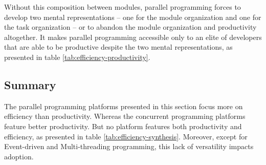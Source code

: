 Without this composition between modules, parallel programming forces to develop two mental representations -- one for the module organization and one for the task organization -- or to abandon the module organization and productivity altogether.
It makes parallel programming accessible only to an elite of developers that are able to be productive despite the two mental representations, as presented in table \ref{tab:efficiency-productivity}.


\subsection{Summary} \label{chapter3:software-efficiency:summary}

The parallel programming platforms presented in this section focus more on efficiency than productivity.
Whereas the concurrent programming platforms feature better productivity.
But no platform features both productivity and efficiency, as presented in table \ref{tab:efficiency-synthesis}.
Moreover, except for Event-driven and Multi-threading programming, this lack of versatility impacts adoption.
















\endinput

Streaming
\cite{Madsen2015}
\cite{Sun2015}

Map Reduce
\cite{Yao2015}


Web assembly
https://medium.com/javascript-scene/what-is-webassembly-the-dawn-of-a-new-era-61256ec5a8f6